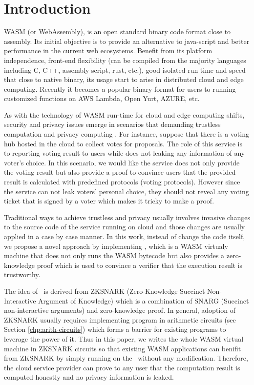 \section{Introduction}
WASM (or WebAssembly), is an open standard binary code format close to assembly. Its initial objective is to provide an alternative to java-script and better performance in the current web ecosystems. Benefit from its platform independence, front-end flexibility (can be compiled from the majority languages including C, C++, assembly script, rust, etc.), good isolated run-time and speed that close to native binary, its usage start to arise in distributed cloud and edge computing. Recently it becomes a popular binary format for users to running customized functions on AWS Lambda, Open Yurt, AZURE, etc.

As with the technology of WASM run-time for cloud and edge computing shifts, security and privacy \cite{ pearson2009taking} issues emerge in scenarios that demanding trustless \cite{wood2016trustless, chang2002trustless} computation and privacy computing \cite{xiao2012security,takabi2010security}. For instance, suppose that there is a voting hub  hosted in the cloud to collect votes for proposals. The role of this service is to reporting voting result to users while does not leaking any information of any voter's choice. In this scenario, we would like the service does not only provide the voting result but also provide a proof to convince users that the provided result is calculated with predefined protocols (voting protocols). However since the service can not leak voters' personal choice, they should not reveal any voting ticket that is signed by a voter which makes it tricky to make a proof. 

Traditional ways to achieve trustless and privacy usually involves invasive changes to the source code of the service running on cloud and those changes are usually applied in a case by case manner. In this work, instead of change the code itself, we propose a novel approach by implementing \zkwasm, which is a WASM virtualy machine that does not only runs the WASM bytecode but also provides a zero-knowledge proof which is used to convince a verifier that the execution result is trustworthy.

The idea of \zkwasm\, is derived from ZKSNARK (Zero-Knowledge Succinct Non-Interactive Argument of Knowledge) which is a combination of SNARG (Succinct non-interactive arguments) and zero-knowledge proof. In general, adoption of ZKSNARK usually requires implementing program in arithmetic circuits (see Section \ref{chp:arith-circuits}) which forms a barrier for existing programs to leverage the power of it. Thus in this paper, we writes the whole WASM virtual machine in ZKSNARK circuits so that existing WASM applications can benifit from ZKSNARK by simply running on the \zkwasm\, without any modification. Therefore, the cloud service provider can prove to any user that the computation result is computed honestly and no privacy information is leaked.

